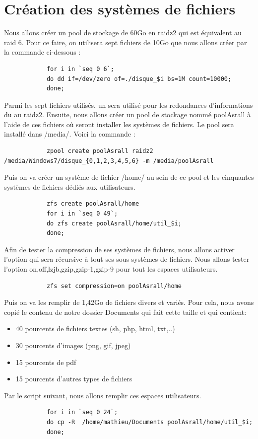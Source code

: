 \documentclass[a4paper]{report}
\begin{document}
	\section{Création des systèmes de fichiers}	
	 Nous allons créer un pool de stockage de 60Go en raidz2 qui est équivalent au raid 6. Pour ce faire, on utilisera sept fichiers de 10Go que nous allons créer par la commande ci-dessous :
		\begin{lstlisting}
			for i in `seq 0 6`;
			do dd if=/dev/zero of=./disque_$i bs=1M count=10000;
			done;
		\end{lstlisting}
	Parmi les sept fichiers utilisés, un sera utilisé pour les redondances d'informations du au raidz2. Ensuite, nous allons créer un pool de stockage nommé poolAsrall à l'aide de ces fichiers où seront installer les systèmes de fichiers. Le pool sera installé dans /media/. Voici la commande :
		\begin{lstlisting}
			zpool create poolAsrall raidz2 /media/Windows7/disque_{0,1,2,3,4,5,6} -m /media/poolAsrall
		\end{lstlisting}
	Puis on va créer un système de fichier /home/ au sein de ce pool et les cinquantes systèmes de fichiers dédiés aux utilisateurs.
		\begin{lstlisting}
			zfs create poolAsrall/home
			for i in `seq 0 49`;
			do zfs create poolAsrall/home/util_$i;
			done;
		\end{lstlisting}
	Afin de tester la compression de ses systèmes de fichiers, nous allons activer l'option qui sera récursive à tout ses sous systèmes de fichiers. Nous allons tester l'option on,off,lzjb,gzip,gzip-1,gzip-9 pour tout les espaces utilisateurs.
		\begin{lstlisting}
			zfs set compression=on poolAsrall/home
		\end{lstlisting}
	Puis on va les remplir de 1,42Go de fichiers divers et variés. Pour cela, nous avons copié le contenu de notre dossier Documents qui fait cette taille et qui contient:
		\begin{itemize}
			\item 40 pourcents de fichiers textes (sh, php, html, txt,..)
			\item 30 pourcents d'images (png, gif, jpeg)
			\item 15 pourcents de pdf
			\item 15 pourcents d'autres types de fichiers
		\end{itemize}
	Par le script suivant, nous allons remplir ces espaces utilisateurs.
		\begin{lstlisting}
			for i in `seq 0 24`;
			do cp -R  /home/mathieu/Documents poolAsrall/home/util_$i;
			done;
		\end{lstlisting}
\end{document}
